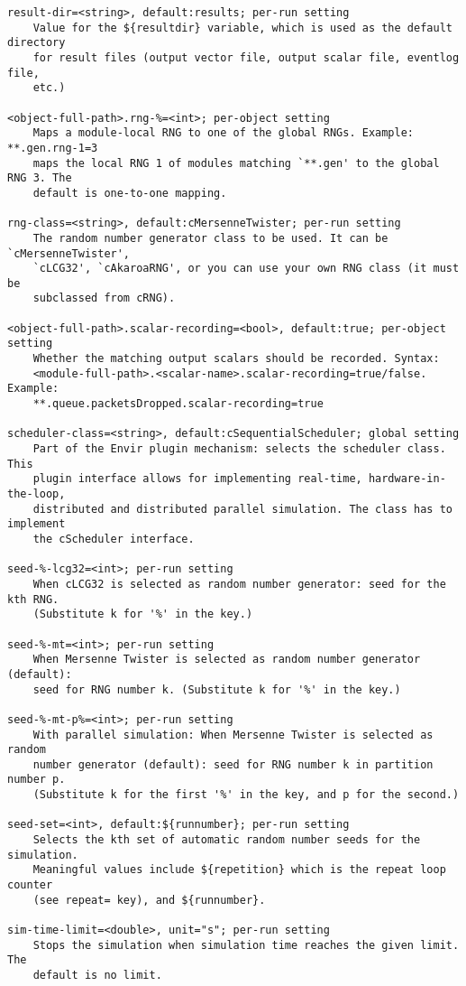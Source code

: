 \begin{verbatim}
result-dir=<string>, default:results; per-run setting
    Value for the ${resultdir} variable, which is used as the default directory
    for result files (output vector file, output scalar file, eventlog file,
    etc.)

<object-full-path>.rng-%=<int>; per-object setting
    Maps a module-local RNG to one of the global RNGs. Example: **.gen.rng-1=3
    maps the local RNG 1 of modules matching `**.gen' to the global RNG 3. The
    default is one-to-one mapping.

rng-class=<string>, default:cMersenneTwister; per-run setting
    The random number generator class to be used. It can be `cMersenneTwister',
    `cLCG32', `cAkaroaRNG', or you can use your own RNG class (it must be
    subclassed from cRNG).

<object-full-path>.scalar-recording=<bool>, default:true; per-object setting
    Whether the matching output scalars should be recorded. Syntax:
    <module-full-path>.<scalar-name>.scalar-recording=true/false. Example:
    **.queue.packetsDropped.scalar-recording=true

scheduler-class=<string>, default:cSequentialScheduler; global setting
    Part of the Envir plugin mechanism: selects the scheduler class. This
    plugin interface allows for implementing real-time, hardware-in-the-loop,
    distributed and distributed parallel simulation. The class has to implement
    the cScheduler interface.

seed-%-lcg32=<int>; per-run setting
    When cLCG32 is selected as random number generator: seed for the kth RNG.
    (Substitute k for '%' in the key.)

seed-%-mt=<int>; per-run setting
    When Mersenne Twister is selected as random number generator (default):
    seed for RNG number k. (Substitute k for '%' in the key.)

seed-%-mt-p%=<int>; per-run setting
    With parallel simulation: When Mersenne Twister is selected as random
    number generator (default): seed for RNG number k in partition number p.
    (Substitute k for the first '%' in the key, and p for the second.)

seed-set=<int>, default:${runnumber}; per-run setting
    Selects the kth set of automatic random number seeds for the simulation.
    Meaningful values include ${repetition} which is the repeat loop counter
    (see repeat= key), and ${runnumber}.

sim-time-limit=<double>, unit="s"; per-run setting
    Stops the simulation when simulation time reaches the given limit. The
    default is no limit.


\end{verbatim}
